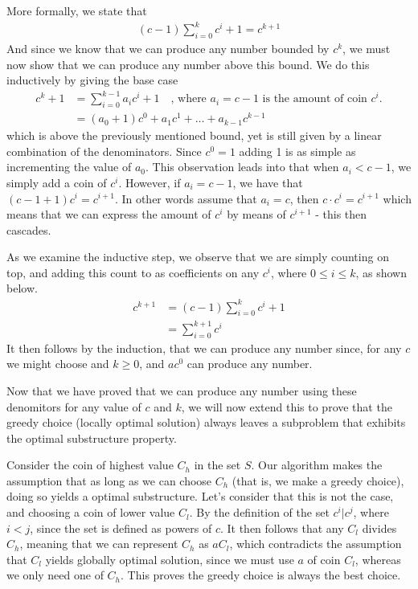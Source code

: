 \documentclass[11pt,english]{article}
\begin{document}
More formally, we state that
\begin{align}
	(c - 1)\sum_{i=0}^{k} c^i + 1 = c^{k+1}
\end{align}
And since we know that we can produce any number bounded by $c^k$, we must
now show that we can produce any number above this bound. We do this
inductively by giving the base case
\begin{align}
	c^k + 1 &= \sum_{i=0}^{k-1} a_i c^i + 1 \nonumber
	\quad \text{, where }a_i = c - 1\text{ is the amount of coin $c^i$.} \\
	& = (a_0 + 1)c^0 + a_1 c^1 + \dots + a_{k-1} c^{k-1}
\end{align}
which is above the previously mentioned bound, yet is still given by a
linear combination of the denominators. Since $c^0 = 1$ adding 1 is as simple
as incrementing the value of $a_0$. This observation leads into that when
$a_i < c - 1$, we simply add a coin of $c^i$. However, if $a_i = c - 1$, we
have that $(c - 1 + 1)c^i = c^{i+1}$. In other words assume that $a_i = c$,
then $c \cdot c^i = c^{i+1}$ which means that we can express the amount of
$c^i$ by means of $c^{i+1}$ - this then cascades.

As we examine the inductive step, we observe that we are simply counting on
top, and adding this count to as coefficients on any $c^i$, where
$0 \leq i \leq k$, as shown below.
\begin{align}
	c^{k+1} &= (c - 1)\sum_{i=0}^{k}{c^i} + 1\\
	&= \sum_{i=0}^{k+1}{c^i} \nonumber
\end{align}
It then follows by the induction, that we can produce any number since, for
any $c$ we might choose and $k \geq 0$, and $ac^0$ can produce any number.

Now that we have proved that we can produce any number using these denomitors
for any value of $c$ and $k$, we will now extend this to prove that the greedy
choice (locally optimal solution) always leaves a subproblem that exhibits the
optimal substructure property.

Consider the coin of highest value $C_h$ in the set $S$. Our algorithm makes
the assumption that as long as we can choose $C_h$ (that is, we make a greedy
choice), doing so yields a optimal substructure. Let's consider that this is
not the case, and choosing a coin of lower value $C_l$. By the definition of
the set $c^i | c^j$, where $i < j$, since the set is defined as powers of $c$.
It then follows that any $C_l$ divides $C_h$, meaning that we can represent
$C_h$ as $aC_l$, which contradicts the assumption that $C_l$ yields globally
optimal solution, since we must use $a$ of coin $C_l$, whereas we only need
one of $C_h$. This proves the greedy choice is always the best choice.
\end{document}

